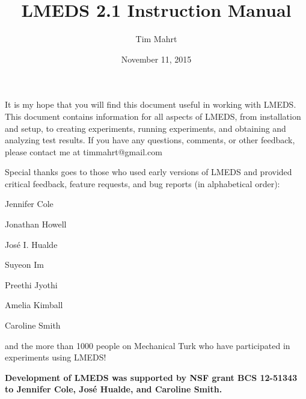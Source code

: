 \documentclass[12pt, oneside]{scrbook}   	%
\title{LMEDS 2.1 Instruction Manual}
\author{Tim Mahrt}
\date{November 11, 2015}
\begin{document}
\maketitle

\newpage

\paragraph{}

It is my hope that you will find this document useful in working with LMEDS. This document contains information for all aspects of LMEDS, from installation and setup, to creating experiments, running experiments, and obtaining and analyzing test results.  If you have any questions, comments, or other feedback, please contact me at timmahrt@gmail.com

\vspace{25mm}

Special thanks goes to those who used early versions of LMEDS and provided critical feedback, feature requests, and bug reports (in alphabetical order):

\vspace{5mm}

Jennifer Cole

Jonathan Howell

José I. Hualde

Suyeon Im

Preethi Jyothi

Amelia Kimball

Caroline Smith

\vspace{5mm}

and the more than 1000 people on Mechanical Turk who have participated in experiments using LMEDS!

\vfill

\begin{tcolorbox}[breakable,colback=white,colframe=green,width=\dimexpr\textwidth+12mm\relax,enlarge left by=-6mm]

\textbf{Development of LMEDS was supported by NSF grant BCS 12-51343 to Jennifer Cole, José Hualde, and Caroline Smith.}

\end{tcolorbox}

\tableofcontents

\newpage







\end{document}
